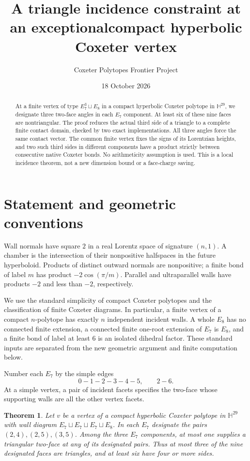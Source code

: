 \documentclass[11pt]{article}
\title{A triangle incidence constraint at an exceptional\linebreak compact hyperbolic Coxeter vertex}
\author{Coxeter Polytopes Frontier Project}
\date{18 October 2026}
\newtheorem{theorem}{Theorem}
\newcommand{\HH}{\mathbb H}
\begin{document}
\maketitle
\begin{abstract}
At a finite vertex of type $E_7^3\sqcup E_8$ in a compact hyperbolic
Coxeter polytope in $\HH^{29}$, we designate three two-face angles in
each $E_7$ component. At least six of these nine faces are nontriangular.
The proof reduces the actual third side of a triangle to a complete
finite contact domain, checked by two exact implementations. All three
angles force the same contact vector. The common finite vertex fixes
the signs of its Lorentzian heights, and two such third sides in different
components have a product strictly between consecutive native Coxeter
bonds. No arithmeticity assumption is used. This is a local incidence
theorem, not a new dimension bound or a face-charge saving.
\end{abstract}

\section{Statement and geometric conventions}
Wall normals have square $2$ in a real Lorentz space of signature $(n,1)$.
A chamber is the intersection of their nonpositive halfspaces in the future
hyperboloid. Products of distinct outward normals are nonpositive; a finite
bond of label $m$ has product $-2\cos(\pi/m)$. Parallel and ultraparallel
walls have products $-2$ and less than $-2$, respectively.

We use the standard simplicity of compact Coxeter polytopes and the
classification of finite Coxeter diagrams. In particular, a finite vertex
of a compact $n$-polytope has exactly $n$ independent incident walls.
A whole $E_8$ has no connected finite extension, a connected finite
one-root extension of $E_7$ is $E_8$, and a finite bond of label at least
$6$ is an isolated dihedral factor. These standard inputs are separated
from the new geometric argument and finite computation below.

Number each $E_7$ by the simple edges
\[
0-1-2-3-4-5,\qquad 2-6.
\]
At a simple vertex, a pair of incident facets specifies the two-face whose
supporting walls are all the other vertex facets.

\begin{theorem}\label{thm:main}
Let $v$ be a vertex of a compact hyperbolic Coxeter polytope in
$\HH^{29}$ with wall diagram $E_7\sqcup E_7\sqcup E_7\sqcup E_8$.
In each $E_7$ designate the pairs $(2,4),(2,5),(3,5)$. Among the three
$E_7$ components, at most one supplies a triangular two-face at any of
its designated pairs. Thus at most three of the nine designated faces
are triangles, and at least six have four or more sides.
\end{theorem}
\end{document}
